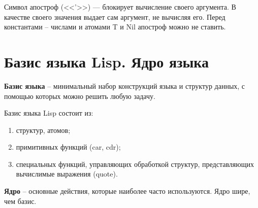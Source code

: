 \documentclass[a4paper,14pt, unknownkeysallowed]{extreport}
\begin{document}
Символ апостроф (<<'>>) — блокирует вычисление своего аргумента. В качестве своего значения выдает сам аргумент, не вычисляя его. Перед константами -- числами и атомами T и Nil апостроф можно не ставить.

\section{Базис языка Lisp. Ядро языка}

\textbf{Базис языка} -- минимальный набор конструкций языка и структур данных, с помощью которых можно решить любую задачу.

Базис языка Lisp состоит из:

\begin{enumerate}
	\item структур, атомов;
	\item примитивных функций (car, cdr);
	\item специальных функций, управляющих обработкой структур, представляющих вычислимые выражения (quote).
\end{enumerate}

\textbf{Ядро} -- основные действия, которые наиболее часто используются. Ядро шире, чем базис.
\end{document}
